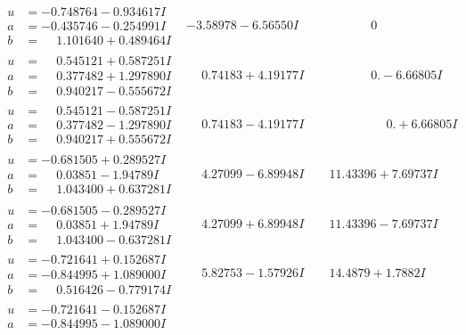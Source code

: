\documentclass[1p]{elsarticle_modified}
\theoremstyle{definition}
\begin{document}
$$\begin{array}{c|c|c}
\begin{aligned}
u &= -0.748764 - 0.934617 I \\
a &= -0.435746 - 0.254991 I \\
b &= \phantom{-}1.101640 + 0.489464 I\end{aligned}
 & -3.58978 - 6.56550 I & \phantom{-0.000000 } 0 \\ \hline\begin{aligned}
u &= \phantom{-}0.545121 + 0.587251 I \\
a &= \phantom{-}0.377482 + 1.297890 I \\
b &= \phantom{-}0.940217 - 0.555672 I\end{aligned}
 & \phantom{-}0.74183 + 4.19177 I & \phantom{-0.000000 } 0. - 6.66805 I \\ \hline\begin{aligned}
u &= \phantom{-}0.545121 - 0.587251 I \\
a &= \phantom{-}0.377482 - 1.297890 I \\
b &= \phantom{-}0.940217 + 0.555672 I\end{aligned}
 & \phantom{-}0.74183 - 4.19177 I & \phantom{-0.000000 -}0. + 6.66805 I \\ \hline\begin{aligned}
u &= -0.681505 + 0.289527 I \\
a &= \phantom{-}0.03851 - 1.94789 I \\
b &= \phantom{-}1.043400 + 0.637281 I\end{aligned}
 & \phantom{-}4.27099 - 6.89948 I & \phantom{-}11.43396 + 7.69737 I \\ \hline\begin{aligned}
u &= -0.681505 - 0.289527 I \\
a &= \phantom{-}0.03851 + 1.94789 I \\
b &= \phantom{-}1.043400 - 0.637281 I\end{aligned}
 & \phantom{-}4.27099 + 6.89948 I & \phantom{-}11.43396 - 7.69737 I \\ \hline\begin{aligned}
u &= -0.721641 + 0.152687 I \\
a &= -0.844995 + 1.089000 I \\
b &= \phantom{-}0.516426 - 0.779174 I\end{aligned}
 & \phantom{-}5.82753 - 1.57926 I & \phantom{-}14.4879 + 1.7882 I \\ \hline\begin{aligned}
u &= -0.721641 - 0.152687 I \\
a &= -0.844995 - 1.089000 I \\

\end{aligned}
\end{array}$$
\end{document}
